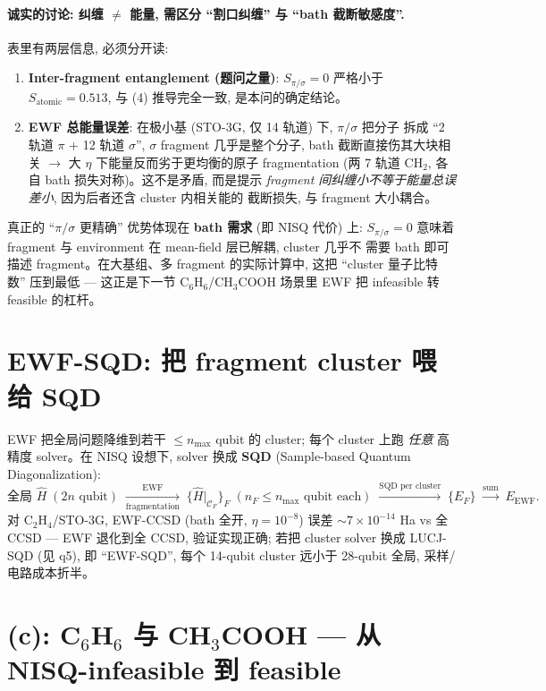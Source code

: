 \documentclass[11pt]{article}
\newcommand{\sig}{\sigma}
\newcommand{\Ewf}{E_{\mathrm{EWF}}}
\begin{document}
\paragraph{诚实的讨论: 纠缠 $\neq$ 能量, 需区分 ``割口纠缠'' 与 ``bath 截断敏感度''.}
表里有两层信息, 必须分开读:
\begin{enumerate}
  \item \textbf{Inter-fragment entanglement (题问之量)}: $S_{\pi/\sig}=0$ 严格小于
        $S_{\text{atomic}}=0.513$, 与 (4) 推导完全一致, 是本问的确定结论。
  \item \textbf{EWF 总能量误差}: 在极小基 (STO-3G, 仅 14 轨道) 下, $\pi/\sig$ 把分子
        拆成 ``2 轨道 $\pi$ + 12 轨道 $\sig$'', $\sig$ fragment 几乎是整个分子, bath
        截断直接伤其大块相关 $\to$ 大 $\eta$ 下能量反而劣于更均衡的原子 fragmentation
        (两 7 轨道 CH$_2$, 各自 bath 损失对称)。这不是矛盾, 而是提示
        \emph{fragment 间纠缠小不等于能量总误差小}, 因为后者还含 cluster 内相关能的
        截断损失, 与 fragment 大小耦合。
\end{enumerate}
真正的 ``$\pi/\sig$ 更精确'' 优势体现在 \textbf{bath 需求} (即 NISQ 代价) 上:
$S_{\pi/\sig}=0$ 意味着 fragment 与 environment 在 mean-field 层已解耦, cluster 几乎不
需要 bath 即可描述 fragment。在大基组、多 fragment 的实际计算中, 这把 ``cluster 量子比特
数'' 压到最低 --- 这正是下一节 C$_6$H$_6$/CH$_3$COOH 场景里 EWF 把 infeasible 转
feasible 的杠杆。

\section{EWF-SQD: 把 fragment cluster 喂给 SQD}
EWF 把全局问题降维到若干 $\le n_{\max}$ qubit 的 cluster; 每个 cluster 上跑 \emph{任意}
高精度 solver。在 NISQ 设想下, solver 换成 \textbf{SQD} (Sample-based Quantum
Diagonalization):
\[
  \text{全局 }\hat H\;(2n\text{ qubit})
  \;\xrightarrow[\text{fragmentation}]{\text{EWF}}\;
  \{\hat H|_{\mathcal{C}_F}\}_{F}\;(n_F\le n_{\max}\text{ qubit each})
  \;\xrightarrow{\text{SQD per cluster}}\;
  \{E_F\}\;\xrightarrow{\text{sum}}\;\Ewf.
\]
对 C$_2$H$_4$/STO-3G, EWF-CCSD (bath 全开, $\eta{=}10^{-8}$) 误差
$\sim7{\times}10^{-14}$ Ha vs 全 CCSD --- EWF 退化到全 CCSD, 验证实现正确;
若把 cluster solver 换成 LUCJ-SQD (见 q5), 即 ``EWF-SQD'', 每个 14-qubit cluster
远小于 28-qubit 全局, 采样/电路成本折半。

\section{(c): C$_6$H$_6$ 与 CH$_3$COOH --- 从 NISQ-infeasible 到 feasible}
\end{document}
